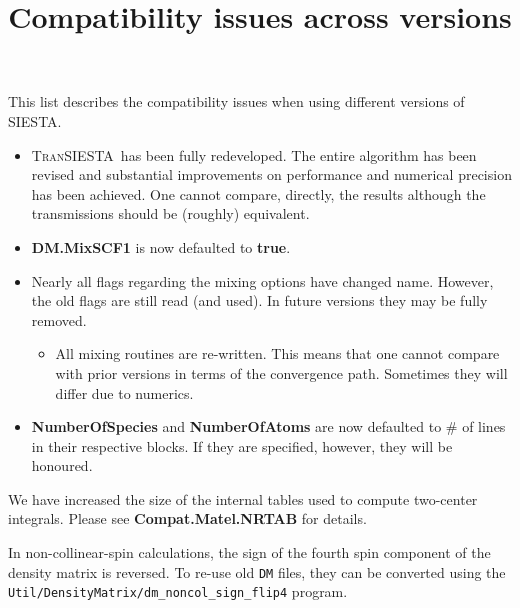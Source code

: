 \documentclass{article}
\title{Compatibility issues across versions}
\author{\siesta}
\newcommand\siesta{\textsc{SIESTA}}
\newcommand\tsiesta{\textsc{TranSIESTA}}
\newcommand{\fdf}[1]{\textbf{#1}}
\newcommand{\opt}[1]{\textbf{#1}}
\newcommand{\code}[1]{\texttt{#1}}
\begin{document}
\maketitle

\clearpage

This list describes the compatibility issues when using different versions of \siesta.

\begin{description}
  \setlength\itemsep{1pt}
  \setlength\topsep{1pt}

  \item[4.1]%
  \begin{itemize}
    \item %
    \tsiesta\ has been fully redeveloped. The entire algorithm has been revised and
    substantial improvements on performance and numerical precision has been achieved. One
    cannot compare, directly, the results although the transmissions should be (roughly)
    equivalent.

    \item %
    \fdf{DM.MixSCF1} is now defaulted to \fdf{true}.

    \item %
    Nearly all flags regarding the mixing options have changed name. However, the old
    flags are still read (and used). In future versions they may be fully removed.

    \begin{itemize}
      \item All mixing routines are re-written. This means that one cannot compare with
      prior versions in terms of the convergence path. Sometimes they will differ due to numerics.
    \end{itemize}

    \item \fdf{NumberOfSpecies} and \fdf{NumberOfAtoms} are now defaulted to \# of lines
    in their respective blocks. If they are specified, however, they will be honoured.

  \end{itemize}
  

  \item[\emph{any} --- 4.0.2, 4.1] %

  We have increased the size of the
  internal tables used to compute two-center integrals. Please see
  \opt{Compat.Matel.NRTAB} for details.
  

  \item[\emph{any} --- 4.0.2] %
  In non-collinear-spin calculations, the sign of the fourth spin
  component of the density matrix is reversed. To re-use old \code{DM} files,
  they can be converted using the
  \code{Util/DensityMatrix/dm_noncol_sign_flip4} program.


\end{description}
\end{document}
